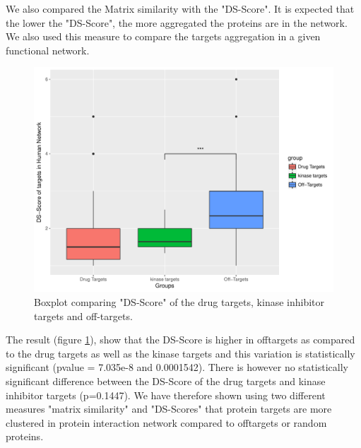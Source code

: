 \documentclass[a4paper, 11pt]{report}
\newcommand{\redcomment}[1]{\textcolor{red}{[#1]}} %
\begin{document}
We also compared the Matrix similarity with the "DS-Score". It is expected that the lower the "DS-Score", the more aggregated the proteins are in the network. We also used this measure to compare the targets aggregation in a given functional network.
\begin{figure}[H]
	\includegraphics[width=\linewidth]{figures/dsboxplot.pdf}
	\centering
	\caption{Boxplot comparing "DS-Score" of the drug targets, kinase inhibitor targets and off-targets.}
		\label{ds_targets}
\end{figure}
The result (figure \ref{ds_targets}), show that the DS-Score is higher in offtargets as compared to the drug targets as well as the kinase targets and this variation is statistically significant (pvalue = 7.035e-8 and 0.0001542). There is however no statistically significant difference between the DS-Score of the drug targets and kinase inhibitor targets (p=0.1447). We have therefore shown using two different measures "matrix similarity" and "DS-Scores" that protein targets are more clustered in protein interaction network compared to offtargets or random proteins. 

\end{document}
